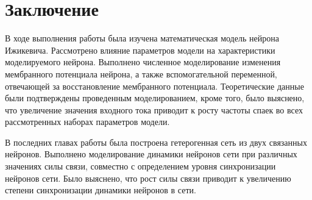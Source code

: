\chapter{Заключение}
\label{ch:chap6}
В ходе выполнения работы была изучена математическая модель нейрона Ижикевича. Рассмотрено влияние параметров модели на характеристики моделируемого нейрона. Выполнено численное моделирование изменения мембранного потенциала нейрона, а также вспомогательной переменной, отвечающей за восстановление мембранного потенциала. Теоретические данные были подтверждены проведенным моделированием, кроме того, было выяснено, что увеличение значения входного тока приводит к росту частоты спаек во всех рассмотренных наборах параметров модели.

 В последних главах работы была построена гетерогенная сеть из двух связанных нейронов. Выполнено моделирование динамики нейронов сети при различных значениях силы связи, совместно с определением уровня синхронизации нейронов сети. Было выяснено, что рост силы связи приводит к увеличению степени синхронизации динамики нейронов в сети.

\endinput
